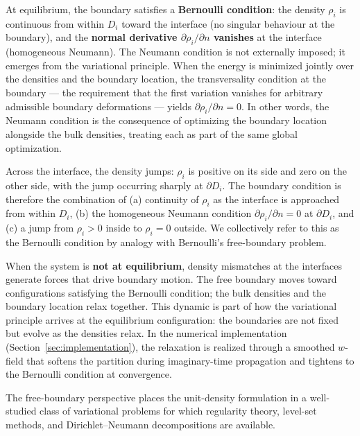 \documentclass[11pt]{article}
\begin{document}
At equilibrium, the boundary satisfies a \textbf{Bernoulli condition}: the density $\rho_i$ is continuous from within $D_i$ toward the interface (no singular behaviour at the boundary), and the \textbf{normal derivative $\partial \rho_i / \partial n$ vanishes} at the interface (homogeneous Neumann). The Neumann condition is not externally imposed; it emerges from the variational principle. When the energy is minimized jointly over the densities and the boundary location, the transversality condition at the boundary --- the requirement that the first variation vanishes for arbitrary admissible boundary deformations --- yields $\partial \rho_i / \partial n = 0$. In other words, the Neumann condition is the consequence of optimizing the boundary location alongside the bulk densities, treating each as part of the same global optimization.

Across the interface, the density jumps: $\rho_i$ is positive on its side and zero on the other side, with the jump occurring sharply at $\partial D_i$. The boundary condition is therefore the combination of (a) continuity of $\rho_i$ as the interface is approached from within $D_i$, (b) the homogeneous Neumann condition $\partial \rho_i / \partial n = 0$ at $\partial D_i$, and (c) a jump from $\rho_i > 0$ inside to $\rho_i = 0$ outside. We collectively refer to this as the Bernoulli condition by analogy with Bernoulli's free-boundary problem.

When the system is \textbf{not at equilibrium}, density mismatches at the interfaces generate forces that drive boundary motion. The free boundary moves toward configurations satisfying the Bernoulli condition; the bulk densities and the boundary location relax together. This dynamic is part of how the variational principle arrives at the equilibrium configuration: the boundaries are not fixed but evolve as the densities relax. In the numerical implementation (Section~\ref{sec:implementation}), the relaxation is realized through a smoothed $w$-field that softens the partition during imaginary-time propagation and tightens to the Bernoulli condition at convergence.

The free-boundary perspective places the unit-density formulation in a well-studied class of variational problems for which regularity theory, level-set methods, and Dirichlet--Neumann decompositions are available.
\end{document}
